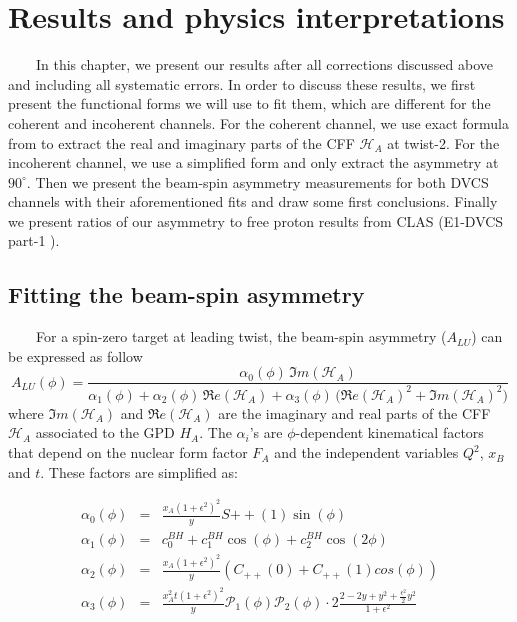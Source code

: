 \chapter{Results and physics interpretations}
~~~~In this chapter, we present our results after all corrections discussed above and including
all systematic errors. In order to discuss these results, we first present the functional forms
we will use to fit them, which are different for the coherent and incoherent 
channels. For the coherent channel, we use exact formula from \cite{FX_BSA} to 
extract the real and imaginary parts
of the CFF $\mathcal{H}_{A}$ at twist-2. For the incoherent channel, we use a simplified form 
and only extract the asymmetry at $90^{\circ}$. Then we present the beam-spin asymmetry 
measurements for both DVCS channels with their aforementioned fits and draw some first 
conclusions. Finally we present ratios of our asymmetry to free proton results 
from CLAS (E1-DVCS part-1 \cite{FX_BSA, FX_analysis_note}).

\section{Fitting the beam-spin asymmetry} \label{Beam-Spin}
~~~~For a spin-zero target at leading twist, the beam-spin asymmetry ($A_{LU}$) 
can be expressed as follow \cite{BM_2009}
\begin{equation}
A_{LU}(\phi) = \frac{\alpha_{0}(\phi) \, \Im m(\mathcal{H}_{A})}
{\alpha_{1}(\phi) + \alpha_{2}(\phi) \, \Re e(\mathcal{H}_{A}) + \alpha_{3}(\phi) \, 
\big( 
\Re e(\mathcal{H}_{A})^{2} + \Im m(\mathcal{H}_{A})^{2} \big)}
\label{eq:A_LU-coh}
\end{equation}
where $\Im m(\mathcal{H}_{A})$ and $\Re e(\mathcal{H}_{A})$ are the imaginary 
and real parts of the CFF $\mathcal{H}_{A}$ associated to the GPD $H_A$. The 
$\alpha_{i}$'s are $\phi$-dependent kinematical factors that depend on the 
nuclear form factor $F_A$ and the independent variables $Q^2$, $x_{B}$ and $t$.  
These factors are simplified as:

\small
\begin{eqnarray}
   \alpha_0 (\phi) & = &\frac{x_{A}(1+\epsilon^2)^2}{y} S{++}(1) \sin(\phi)\\
    \alpha_1 (\phi) & = & c_0^{BH}+c_1^{BH} \cos({\phi})+c_2^{BH} \cos(2\phi)\\ 
   \alpha_2 (\phi) & = & \frac{x_{A}(1+\epsilon^2)^2}{y}  \left( C_{++}(0) +  
C_{++}(1) cos(\phi) \right)\\
\alpha_3 (\phi) &=& \frac{x^{2}_{A}t(1+\epsilon^2)^2}{y} {\mathcal P}_1(\phi) 
{\mathcal P}_2(\phi) \cdot 2 \frac{2-2y+y^2 + \frac{\epsilon^2}{2}y^2}{1 + 
\epsilon^2}
\end{eqnarray}
\normalsize

